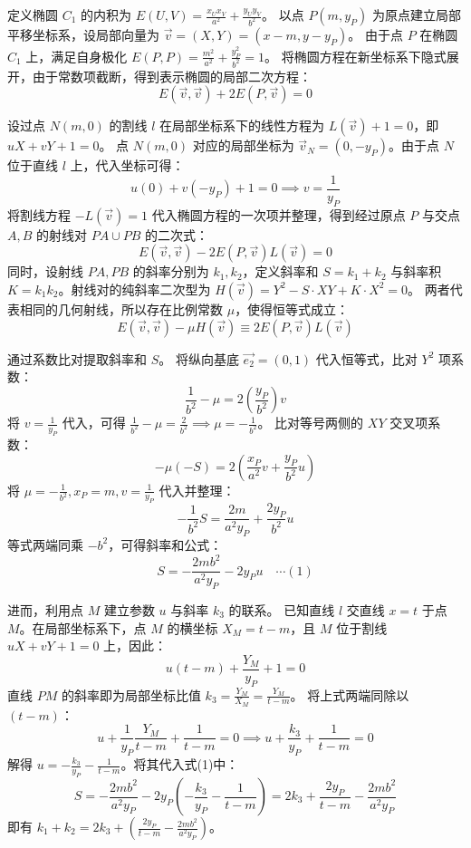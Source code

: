 \begin{solution}
定义椭圆 $C_1$ 的内积为 $E(U,V) = \frac{x_U x_V}{a^2} + \frac{y_U y_V}{b^2}$。
以点 $P(m, y_P)$ 为原点建立局部平移坐标系，设局部向量为 $\vec{v} = (X, Y) = (x-m, y-y_P)$。
由于点 $P$ 在椭圆 $C_1$ 上，满足自身极化 $E(P,P) = \frac{m^2}{a^2} + \frac{y_P^2}{b^2} = 1$。
将椭圆方程在新坐标系下隐式展开，由于常数项截断，得到表示椭圆的局部二次方程：
$$ E(\vec{v}, \vec{v}) + 2E(P, \vec{v}) = 0 $$

设过点 $N(m,0)$ 的割线 $l$ 在局部坐标系下的线性方程为 $L(\vec{v}) + 1 = 0$，即 $uX + vY + 1 = 0$。
点 $N(m,0)$ 对应的局部坐标为 $\vec{v}_N = (0, -y_P)$。由于点 $N$ 位于直线 $l$ 上，代入坐标可得：
$$ u(0) + v(-y_P) + 1 = 0 \implies v = \frac{1}{y_P} $$
将割线方程 $-L(\vec{v}) = 1$ 代入椭圆方程的一次项并整理，得到经过原点 $P$ 与交点 $A, B$ 的射线对 $PA \cup PB$ 的二次式：
$$ E(\vec{v}, \vec{v}) - 2E(P, \vec{v})L(\vec{v}) = 0 $$
同时，设射线 $PA, PB$ 的斜率分别为 $k_1, k_2$，定义斜率和 $S = k_1 + k_2$ 与斜率积 $K = k_1 k_2$。射线对的纯斜率二次型为 $H(\vec{v}) = Y^2 - S \cdot XY + K \cdot X^2 = 0$。
两者代表相同的几何射线，所以存在比例常数 $\mu$，使得恒等式成立：
$$ E(\vec{v}, \vec{v}) - \mu H(\vec{v}) \equiv 2E(P, \vec{v}) L(\vec{v}) $$

通过系数比对提取斜率和 $S$。
将纵向基底 $\vec{e_2} = (0,1)$ 代入恒等式，比对 $Y^2$ 项系数：
$$ \frac{1}{b^2} - \mu = 2 \left( \frac{y_P}{b^2} \right) v $$
将 $v = \frac{1}{y_P}$ 代入，可得 $\frac{1}{b^2} - \mu = \frac{2}{b^2} \implies \mu = -\frac{1}{b^2}$。
比对等号两侧的 $XY$ 交叉项系数：
$$ -\mu(-S) = 2 \left( \frac{x_P}{a^2} v + \frac{y_P}{b^2} u \right) $$
将 $\mu = -\frac{1}{b^2}, x_P = m, v = \frac{1}{y_P}$ 代入并整理：
$$ -\frac{1}{b^2} S = \frac{2m}{a^2 y_P} + \frac{2y_P}{b^2} u $$
等式两端同乘 $-b^2$，可得斜率和公式：
$$ S = -\frac{2mb^2}{a^2 y_P} - 2y_P u \quad \cdots (1) $$

进而，利用点 $M$ 建立参数 $u$ 与斜率 $k_3$ 的联系。
已知直线 $l$ 交直线 $x=t$ 于点 $M$。在局部坐标系下，点 $M$ 的横坐标 $X_M = t-m$，且 $M$ 位于割线 $uX + vY + 1 = 0$ 上，因此：
$$ u(t-m) + \frac{Y_M}{y_P} + 1 = 0 $$
直线 $PM$ 的斜率即为局部坐标比值 $k_3 = \frac{Y_M}{X_M} = \frac{Y_M}{t-m}$。
将上式两端同除以 $(t-m)$：
$$ u + \frac{1}{y_P} \frac{Y_M}{t-m} + \frac{1}{t-m} = 0 \implies u + \frac{k_3}{y_P} + \frac{1}{t-m} = 0 $$
解得 $u = -\frac{k_3}{y_P} - \frac{1}{t-m}$。将其代入式(1)中：
$$ S = -\frac{2mb^2}{a^2 y_P} - 2y_P \left( -\frac{k_3}{y_P} - \frac{1}{t-m} \right) = 2k_3 + \frac{2y_P}{t-m} - \frac{2mb^2}{a^2 y_P} $$
即有 $k_1 + k_2 = 2k_3 + \left( \frac{2y_P}{t-m} - \frac{2mb^2}{a^2 y_P} \right)$。


\end{solution}
